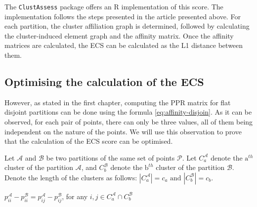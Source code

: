 The \verb|ClustAssess| package offers an R implementation of this score. The implementation follows the steps presented in the article presented above. For each partition, the cluster affiliation graph is determined, followed by calculating the cluster-induced element graph and the affinity matrix. Once the affinity matrices are calculated, the ECS can be calculated as the L1 distance between them.

\subsection{Optimising the calculation of the ECS}
However, as stated in the first chapter, computing the PPR matrix for flat disjoint partitions can be done using the formula \ref{eq:affinity-disjoin}. As it can be observed, for each pair of points, there can only be three values, all of them being independent on the nature of the points. We will use this observation to prove that the calculation of the ECS score can be optimised.



Let $\mathcal{A}$ and $\mathcal{B}$ be two partitions of the same set of points $\mathcal{P}$. Let $C_a^\mathcal{A}$ denote the $\text{a}^{th}$ cluster of the partition $\mathcal{A}$, and $C_b^\mathcal{B}$ denote the $\text{b}^{th}$ cluster of the partition $\mathcal{B}$. Denote the length of the clusters as follows: $|C_a^{\mathcal{A}}| = c_a \text{ and } |C_b^{\mathcal{B}}| = c_b$.

\begin{remark} \label{remark:pii}
    $p_{ii}^\mathcal{A} - p_{ii}^\mathcal{B} = p_{ij}^\mathcal{A} - p_{ij}^\mathcal{B}$, for any $i, j \in C_a^\mathcal{A} \cap C_b^\mathcal{B}$
\end{remark}

